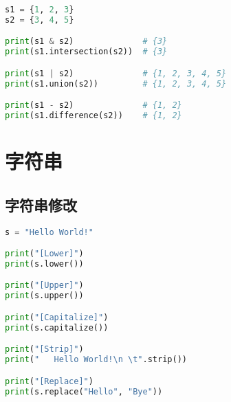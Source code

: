 \vspace{-0.5cm}

\begin{lstlisting}[language=Python]
s1 = {1, 2, 3}
s2 = {3, 4, 5}

print(s1 & s2)				# {3}
print(s1.intersection(s2))	# {3}

print(s1 | s2)				# {1, 2, 3, 4, 5}
print(s1.union(s2))			# {1, 2, 3, 4, 5}

print(s1 - s2)				# {1, 2}
print(s1.difference(s2))	# {1, 2}
\end{lstlisting}

\newpage

\section{字符串}

\subsection{字符串修改}

\begin{table}[H]
	\centering
\end{table}


\begin{lstlisting}[language=Python]
s = "Hello World!"

print("[Lower]")
print(s.lower())

print("[Upper]")
print(s.upper())

print("[Capitalize]")
print(s.capitalize())

print("[Strip]")
print("   Hello World!\n \t".strip())

print("[Replace]")
print(s.replace("Hello", "Bye"))
\end{lstlisting}

